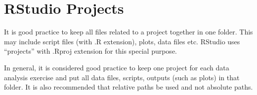 \documentclass[12pt,]{article}
\begin{document}
\section{RStudio Projects}\label{rstudio-projects}

It is good practice to keep all files related to a project together in
one folder. This may include script files (with .R extension), plots,
data files etc. RStudio uses ``projects'' with .Rproj extension for this
special purpose.

In general, it is considered good practice to keep one project for each
data analysis exercise and put all data files, scripts, outputs (such as
plots) in that folder. It is also recommended that relative paths be
used and not absolute paths.
\end{document}
